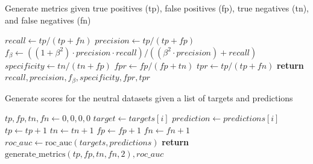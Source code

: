\begin{algorithm}[H]
    \caption{Generate metrics given true positives (tp), false positives (fp), true negatives (tn), and false negatives (fn)}
    \begin{algorithmic}[1]
        \State $recall \gets tp / (tp + fn)$ 
        \State $precision \gets tp / (tp + fp)$ 
        \State $f_{\beta} \gets ((1 + \beta^2) \cdot precision \cdot recall) / ((\beta^2 \cdot precision) + recall)$ 
        \State $specificity \gets tn / (tn + fp)$ 
        \State
        \State $fpr \gets fp / (fp + tn)$ 
        \State $tpr \gets tp / (tp + fn)$
        \State
        \State \textbf{return} $recall, precision, f_{\beta}, specificity, fpr, tpr$
        \EndFunction
    \end{algorithmic}
    \label{alg:generate_metrics}
\end{algorithm}


\begin{algorithm}[H]
    \caption{Generate scores for the neutral datasets given a list of targets and predictions}
    \begin{algorithmic}[1]
        \State $tp, fp, tn, fn \gets 0, 0, 0, 0$
        \State
        \State $target \gets targets[i]$
        \State $prediction \gets predictions[i]$
        \State $tp \gets tp + 1$
        \State $tn \gets tn + 1$
        \State $fp \gets fp + 1$
        \State $fn \gets fn + 1$
        \EndIf
        \EndFor
        \State $roc\_auc \gets \text{roc\_auc}(targets, predictions)$ 
        \State \textbf{return} $\text{generate\_metrics}(tp, fp, tn, fn, 2), roc\_auc$ 
        \EndFunction
    \end{algorithmic}
    \label{alg:neutral_scores}
\end{algorithm}

